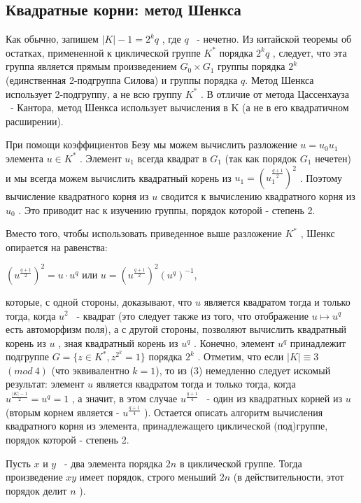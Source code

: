 \documentclass{mai_book}
\begin{document}
\newpage


\subsection{Квадратные корни: метод Шенкса}


Как обычно, запишем $|K|-1=2^kq$
, где $q$
 ~- нечетно. Из китайской теоремы об остатках, примененной к циклической группе $K^*$
 порядка $2^kq$
 , следует, что эта группа является прямым произведением $G_0\times G_1$
 группы порядка $2^k$
 (единственная 2-подгруппа Силова) и группы порядка $q$. Метод Шенкса использует 2-подгруппу, а не всю группу $K^*$
 . В отличие от метода Цассенхауза ~- Кантора, метод Шенкса использует вычисления в K (а не в его квадратичном расширении).

При помощи коэффициентов Безу мы можем вычислить разложение $u=u_0u_1$
 элемента $u\in K^*$
 . Элемент $u_1$
 всегда квадрат в $G_1$
 (так как порядок $G_1$
 нечетен) и мы всегда можем вычислить квадратный корень из $u_1=(u_1^{\frac{q+1}{2}})^2$
 . Поэтому вычисление квадратного корня из $u$
 сводится к вычислению квадратного корня из $u_0$
 . Это приводит нас к изучению группы, порядок которой - степень 2.

Вместо того, чтобы использовать приведенное выше разложение $K^*$
, Шенкс опирается на равенства:

\begin{center}
$(u^{\frac{q+1}{2}})^2 = u\cdot u^q$ или $u=(u^{\frac{q+1}{2}})^2(u^q)^{-1}$,
\end{center}


которые, с одной стороны, доказывают, что $u$
 является квадратом тогда и только тогда, когда $u^2$
 ~- квадрат (это следует также из того, что отображение $u\mapsto u^q$
 есть автоморфизм поля), а с другой стороны, позволяют вычислить квадратный корень из $u$
 , зная квадратный корень из $u^q$
. Конечно, элемент $u^q$
 принадлежит подгруппе $G=\{z\in K^*, z^{2^k}=1\}$
 порядка $2^k$
 . Отметим, что если $|K|\equiv 3$ $(mod \ 4)$
 (что эквивалентно $k = 1$), то из (3) немедленно следует искомый результат: элемент $u$
 является квадратом тогда и только тогда, когда $u^{\frac{|K|-1}{2}}=u^q=1$
 , а значит, в этом случае $u^{\frac{q+1}{4}}$
 ~- один из квадратных корней из $u$
 (вторым корнем является - $u^{\frac{q+1}{4}}$
    ). Остается описать алгоритм вычисления квадратного корня из элемента, принадлежащего циклической (под)группе, порядок которой - степень 2.

\begin{lemma}
Пусть $x$
 и $y$
 ~- два элемента порядка $2n$
 в циклической группе. Тогда произведение $xy$
 имеет порядок, строго меньший $2n$
 (в действительности, этот порядок делит $n$
    ).
\end{lemma}
\end{document}
